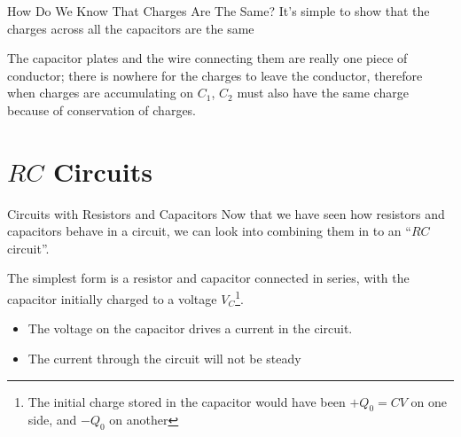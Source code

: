 \documentclass[12pt,aspectratio=169]{beamer}
\begin{document}
\begin{frame}{How Do We Know That Charges Are The Same?}
  It's simple to show that the charges across all the capacitors are the same
  \begin{center}
  \end{center}
  The capacitor plates and the wire connecting them are really one piece of
  conductor; there is nowhere for the charges to leave the conductor, therefore
  when charges are accumulating on $C_1$, $C_2$ must also have the same charge
  because of conservation of charges.
\end{frame}



\section{$RC$ Circuits}

\begin{frame}{Circuits with Resistors and Capacitors}
  Now that we have seen how resistors and capacitors behave in a circuit, we
  can look into combining them in to an ``$RC$ circuit''.
  \begin{center}
  \end{center}
  The simplest form is a resistor and capacitor connected in series, with the
  capacitor initially charged to a voltage $V_C$\footnote{The initial charge
  stored in the capacitor would have been $+Q_0=CV$ on one side, and $-Q_0$ on
  another}.
  \begin{itemize}
  \item The voltage on the capacitor drives a current in the circuit.
  \item The current through the circuit will not be steady
  \end{itemize}
  \vspace{.2in}
\end{frame}
\end{document}
